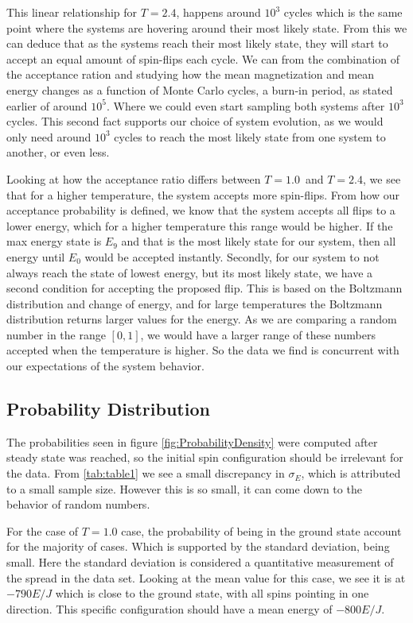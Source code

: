 \documentclass[%
reprint,
nofootinbib,
amsmath,amssymb,
aps,
]{revtex4-1}
\begin{document}
This linear relationship for $T=2.4$, happens around $10^3$ cycles which is the same point where the systems are hovering around their most likely state. From this we can deduce that as the systems reach their most likely state, they will start to accept an equal amount of spin-flips each cycle. We can from the combination of the acceptance ration and studying how the mean magnetization and mean energy changes as a function of Monte Carlo cycles, a burn-in period, as stated earlier of around $10^5$. Where we could even start sampling both systems after $10^3$ cycles. This second fact supports our choice of system evolution, as we would only need around $10^3$ cycles to reach the most likely state from one system to another, or even less. 

Looking at how the acceptance ratio differs between $T=1.0$ and $T=2.4$, we see that for a higher temperature, the system accepts more spin-flips. From how our acceptance probability is defined, we know that the system accepts all flips to a lower energy, which for a higher temperature this range would be higher. If the max energy state is $E_9$ and that is the most likely state for our system, then all energy until $E_0$ would be accepted instantly. Secondly, for our system to not always reach the state of lowest energy, but its most likely state, we have a second condition for accepting the proposed flip. This is based on the Boltzmann distribution and change of energy, and for large temperatures the Boltzmann distribution returns larger values for the energy. As we are comparing a random number in the range $[0,1]$,  we would have a larger range of these numbers accepted when the temperature is higher. 
So the data we find is concurrent with our expectations of the system behavior. 

\subsection{Probability Distribution} %
The probabilities seen in figure \ref{fig:ProbabilityDensity} were computed after steady state was reached, so the initial spin configuration should be irrelevant for the data. From \autoref{tab:table1} we see a small discrepancy in $\sigma_E$, which is attributed to a small sample size. However this is so small, it can come down to the behavior of random numbers. 

For the case of $T=1.0$ case, the probability of being in the ground state account for the majority of cases. Which is supported by the standard deviation, being small. Here the standard deviation is considered a quantitative measurement of the spread in the data set. Looking at the mean value for this case, we see it is at $-790E/J$ which is close to the ground state, with all spins pointing in one direction. This specific configuration should have a mean energy of $-800E/J$. 
\end{document}
